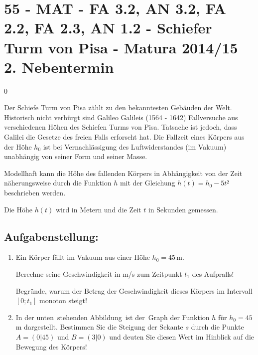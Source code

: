 \section{55 - MAT - FA 3.2, AN 3.2, FA 2.2, FA 2.3, AN 1.2 - Schiefer Turm von Pisa - Matura 2014/15 2. Nebentermin}

\begin{langesbeispiel} \item[0] %
				
	Der Schiefe Turm von Pisa zählt zu den bekanntesten Gebäuden der Welt. Historisch nicht verbürgt sind Galileo Galileis (1564 - 1642) Fallversuche aus verschiedenen Höhen des Schiefen Turms von Pisa. Tatsache ist jedoch, dass Galilei die Gesetze des freien Falls erforscht hat. Die Fallzeit eines Körpers aus der Höhe $h_0$ ist bei Vernachlässigung des Luftwiderstandes (im Vakuum) unabhängig von seiner Form und seiner Masse. 
	
	Modellhaft kann die Höhe des fallenden Körpers in Abhängigkeit von der Zeit näherungsweise durch die Funktion $h$ mit der Gleichung $h(t)=h_0-5t²$ beschrieben werden. 
	
	Die Höhe $h(t)$ wird in Metern und die Zeit $t$ in Sekunden gemessen.


\subsection{Aufgabenstellung:}
\begin{enumerate}
	\item Ein Körper fällt im Vakuum aus einer Höhe $h_0=45$\,m.
	
	 Berechne seine Geschwindigkeit in m/s zum Zeitpunkt $t_1$ des Aufpralls!\leer
	
	Begründe, warum der Betrag der Geschwindigkeit dieses Körpers im Intervall $[0;t_1]$ monoton steigt!
	
\item In der unten stehenden Abbildung ist der Graph der Funktion $h$ für $h_0=45$\,m dargestellt.  Bestimmen Sie die Steigung der Sekante $s$ durch die Punkte $A=(0|45)$ und $B=(3|0)$ und  deuten Sie diesen Wert im Hinblick auf die Bewegung des Körpers!


\end{enumerate}
\end{langesbeispiel}
